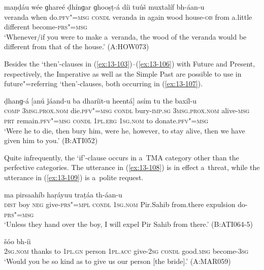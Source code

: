 \begin{exe}
\ex
\label{ex:13-106}
 maṇḍáu wée  ɡhareé ḍhínɡar ɡhooṣṭ-á díi tuúš muxtalíf bh-áan-u  \\
veranda when do.\textsc{pfv"=msg} \textsc{condl} veranda in  again wood house-\textsc{ob} from a.little different become-\textsc{prs"=msg} \\
\glt `Whenever/if you were to make a~veranda, the wood of the veranda would be different from that of the house.' (A:HOW073) 
\end{exe}

Besides the `then'-clauses in (\ref{ex:13-103})--(\ref{ex:13-106}) with Future and Present, respectively, the Imperative as well as the Simple Past are possible to use in future"=referring `then'-clauses, both occurring in (\ref{ex:13-107}).

\begin{exe}
\ex
\label{ex:13-107}
 ḍhanɡ-á  [anú ǰáand-u ba dharíit-u
  heentá]  asím tu the baxíl-u \\
\textsc{comp} \textsc{3msg.prox.nom} die.\textsc{pfv"=msg} \textsc{condl} bury-\textsc{imp.sg}  \textsc{3msg.prox.nom} alive-\textsc{msg} \textsc{prt} remain.\textsc{pfv"=msg} \textsc{condl}  \textsc{1pl.erg} \textsc{1sg.nom} to donate.\textsc{pfv"=msg} \\
\glt `Were he to die, then bury him, were he, however, to stay alive, then we have given him to you.' (B:ATI052) 
\end{exe}

Quite infrequently, the `if'-clause occurs in a~TMA category other than the perfective categories. The utterance in (\ref{ex:13-108}) is in effect a~threat, while the utterance in (\ref{ex:13-109}) is a~polite request.

\begin{exe}
\ex
\label{ex:13-108}
 ma  pirsaahíb haṛáyuu traṭáa th-áan-u \\
 \textsc{dist}{\protect\footnotemark} boy \textsc{neg} give-\textsc{prs"=mpl} \textsc{condl} \textsc{1sg.nom}  Pir.Sahib  from.there expulsion do-\textsc{prs"=msg} \\
\glt `Unless they hand over the boy, I will expel Pir Sahib from there.' (B:ATI064-5)

\ex
\label{ex:13-109}
 šóo bh-íi  \\
\textsc{2sg.nom} thanks to \textsc{1pl.gn} person \textsc{1pl.acc} give-\textsc{2sg}  \textsc{condl} good.\textsc{msg} become-\textsc{3sg} \\
\glt `Would you be so kind as to give us our person [the bride].' (A:MAR059) 
\end{exe}

